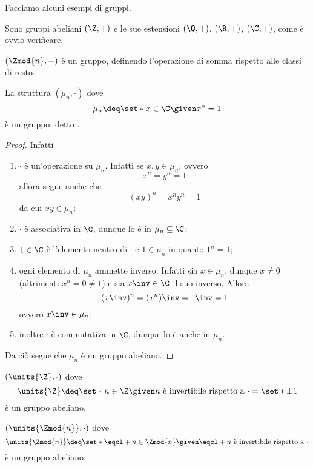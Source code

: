 Facciamo alcuni esempi di gruppi.
\begin{example}
    Sono gruppi abeliani $(\Z, +)$ e le sue estensioni $(\Q, +)$, $(\R, +)$, $(\C, +)$, come è ovvio verificare.
\end{example}
\begin{example}
    $(\Zmod{n}, +)$ è un gruppo, definendo l'operazione di somma rispetto alle classi di resto.
\end{example}
\begin{example}
    La struttura $(\mu_n, \cdot)$ dove \[
        \mu_n \deq \set*{x \in \C \given x^n = 1}    
    \] è un gruppo, detto .
\end{example}
\begin{proof}
    Infatti \begin{enumerate}[(G0)]
        \item $\cdot$ è un'operazione su $\mu_n$. Infatti se $x, y \in \mu_n$, ovvero \[
            x^n = y^n = 1    
        \] allora segue anche che \[
            (xy)^n = x^ny^n = 1    
        \] da cui $xy \in \mu_n$;
        \item $\cdot$ è associativa in $\C$, dunque lo è in $\mu_n \subseteq \C$;
        \item $1 \in \C$ è l'elemento neutro di $\cdot$ e $1 \in \mu_n$ in quanto $1^n = 1$;
        \item ogni elemento di $\mu_n$ ammette inverso. Infatti sia $x \in \mu_n$, dunque $x \neq 0$ (altrimenti $x^n = 0 \neq 1$) e sia $x\inv \in \C$ il suo inverso. Allora \[
            (x\inv)^n = (x^n)\inv = 1\inv = 1    
        \] ovvero $x\inv \in \mu_n$;
        \item inoltre $\cdot$ è commutativa in $\C$, dunque lo è anche in $\mu_n$.
    \end{enumerate}
    Da ciò segue che $\mu_n$ è un gruppo abeliano.
\end{proof}
\begin{example}
    $(\units{\Z}, \cdot)$ dove \[
        \units{\Z} \deq \set*{n \in \Z \given n \text{ è invertibile rispetto a } \cdot} = \set*{\pm 1}
    \] è un gruppo abeliano.
\end{example}
\begin{example}
    $(\units{\Zmod{n}}, \cdot)$ dove \[
        \units{\Zmod{n}} \deq \set*{\eqcl+ n \in \Zmod{n} \given \eqcl+ n \text{ è invertibile rispetto a } \cdot}
    \] è un gruppo abeliano.
\end{example}

